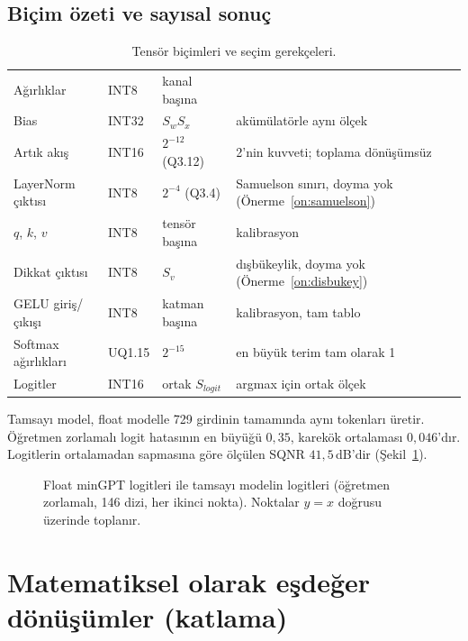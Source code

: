 \subsection{Biçim özeti ve sayısal sonuç}

\begin{table}[h]
  \centering\small
  \caption{Tensör biçimleri ve seçim gerekçeleri.}
  \label{tab:bicim}
  \begin{tabularx}{\textwidth}{@{}lllL@{}}
    \toprule
     &  &  &  \\ \midrule
    Ağırlıklar & INT8 & kanal başına & \cite{jacob18} \\
    Bias & INT32 & $S_w S_x$ & akümülatörle aynı ölçek \\
    Artık akış & INT16 & $2^{-12}$ (Q3.12) & 2'nin kuvveti; toplama dönüşümsüz \\
    LayerNorm çıktısı & INT8 & $2^{-4}$ (Q3.4) & Samuelson sınırı, doyma yok (Önerme~\ref{on:samuelson}) \\
    $q$, $k$, $v$ & INT8 & tensör başına & kalibrasyon \\
    Dikkat çıktısı & INT8 & $S_v$ & dışbükeylik, doyma yok (Önerme~\ref{on:disbukey}) \\
    GELU giriş/çıkışı & INT8 & katman başına & kalibrasyon, tam tablo \\
    Softmax ağırlıkları & UQ1.15 & $2^{-15}$ & en büyük terim tam olarak 1 \\
    Logitler & INT16 & ortak $S_{logit}$ & argmax için ortak ölçek \\ \bottomrule
  \end{tabularx}
\end{table}

Tamsayı model, float modelle 729 girdinin tamamında aynı tokenları üretir. Öğretmen zorlamalı logit hatasının en büyüğü $0{,}35$, karekök ortalaması $0{,}046$'dır. Logitlerin ortalamadan sapmasına göre ölçülen SQNR $41{,}5$\,dB'dir (Şekil~\ref{fig:logit}).

\begin{figure}[h]
  \centering
  \caption[Float ve tamsayı logitleri]{Float minGPT logitleri ile tamsayı modelin logitleri (öğretmen zorlamalı, 146 dizi, her ikinci nokta). Noktalar $y=x$ doğrusu üzerinde toplanır.}
  \label{fig:logit}
\end{figure}

\section{Matematiksel olarak eşdeğer dönüşümler (katlama)}\label{sec:katlama}

